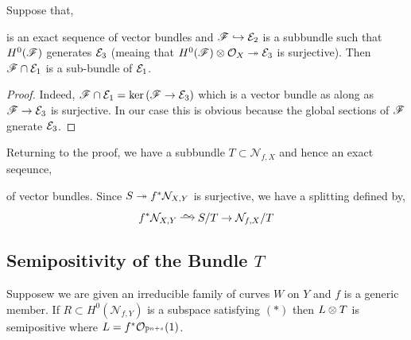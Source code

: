 \documentclass[12pt]{article}
\newcommand{\cN}{\mathcal{N}}
\begin{document}
\begin{lemma}
Suppose that,
\begin{center}
\end{center}
is an exact sequence of vector bundles and $\mathscr{F} \hookrightarrow \mathcal{E}_2$ is a subbundle such that $H^0(\mathscr{F})$ generates $\mathcal{E}_3$ (meaing that $H^0(\mathscr{F}) \otimes \mathcal{O}_{X} \twoheadrightarrow \mathcal{E}_3$ is surjective). Then $\mathscr{F} \cap \mathcal{E}_1$ is a sub-bundle of $\mathcal{E}_1$.
\end{lemma}

\begin{proof}
Indeed, $\mathscr{F} \cap \mathcal{E}_1 = \ker{(\mathscr{F}\to \mathcal{E}_3)}$ which is a vector bundle as along as $\mathscr{F} \to \mathcal{E}_3$ is surjective. In our case this is obvious because the global sections of $\mathscr{F}$ gnerate $\mathcal{E}_3$. 
\end{proof}

Returning to the proof, we have a subbundle $T \subset \cN_{f,X}$ and hence an exact seqeunce,
\begin{center}
\end{center}
of vector bundles. Since $S \onto f^* \cN_{X,Y}$ is surjective, we have a splitting defined by,
\[ f^* \cN_{X,Y} \iso S / T \to \cN_{f,X} / T \]

\subsection{Semipositivity of the Bundle $T$}

\begin{theorem}
Supposew we are given an irreducible family of curves $W$ on $Y$ and $f$ is a generic member. If $R \subset H^0(\cN_{f,Y})$ is a subspace satisfying $(\ast)$ then $L \otimes T$ is semipositive where $L = f^* \mathcal{O}_{\mathbb{P}^{n+s}}(1)$.
\end{theorem}
\end{document}
